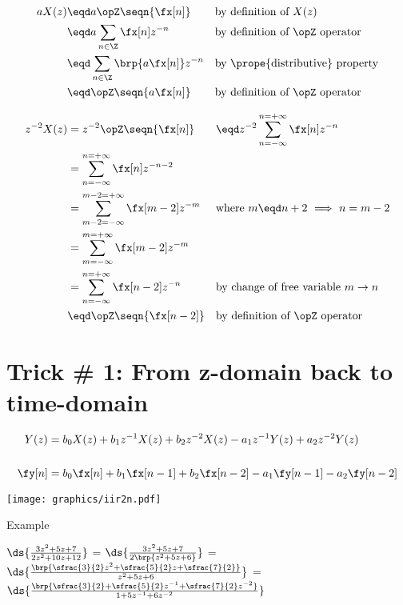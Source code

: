 \begin{align*}
  a X(z)
    &\eqd a \opZ \seqn{\fx[n]}                && \text{by definition of $X(z)$}
  \\&\eqd a \sum_{n\in\Z} \fx[n] z^{-n}       && \text{by definition of $\opZ$ operator}
  \\&\eqd \sum_{n\in\Z} \brp{a \fx[n]} z^{-n} && \text{by \prope{distributive} property}
  \\&\eqd \opZ\seqn{a\fx[n]}                  && \text{by definition of $\opZ$ operator}
\end{align*}

\begin{align*}
  z^{-2}X(z) 
    &= z^{-2} \opZ\seqn{\fx[n]}
   &&\eqd z^{-2}\sum_{n=-\infty}^{n=+\infty} \fx[n] z^{-n}
  \\&=          \sum_{n=-\infty}^{n=+\infty} \fx[n] z^{-n-2}
  \\&=          \sum_{m-2=-\infty}^{m-2=+\infty} \fx[m-2] z^{-m}
    && \text{where $m\eqd n+2$ $\implies$ $n=m-2$}
  \\&=          \sum_{m=-\infty}^{m=+\infty} \fx[m-2] z^{-m}
  \\&=          \sum_{n=-\infty}^{n=+\infty} \fx[n-2] z^{-n}
    && \text{by change of free variable $m\rightarrow n$}
  \\&\eqd \opZ\seqn{\fx[n-2]}
    && \text{by definition of $\opZ$ operator}
\end{align*}

\section*{Trick \# 1: From z-domain back to time-domain}

\begin{align*}
  Y(z) &=  b_0X(z) + b_1z^{-1}X(z)  + b_2z^{-2}X(z) - a_1 z^{-1}Y(z) + a_2z^{-2}Y(z)
  \\\\
  \fy[n] &= b_0\fx[n] + b_1\fx[n-1] + b_2\fx[n-2] - a_1\fy[n-1] - a_2\fy[n-2]
\end{align*}

\texttt{[image: graphics/iir2n.pdf]}



Example

$\ds{\frac{3z^2 + 5z + 7}{2z^2 + 10z + 12}}$
=
$\ds{\frac{3z^2 + 5z + 7}{2\brp{z^2 + 5z + 6}}}$
=
$\ds{\frac{\brp{\sfrac{3}{2}z^2 + \sfrac{5}{2}z + \sfrac{7}{2}}}
               {z^2 + 5z + 6}}$
=
$\ds{\frac{\brp{\sfrac{3}{2} + \sfrac{5}{2}z^{-1} + \sfrac{7}{2}z^{-2}}}
               {1 + 5z^{-1} + 6z^{-2}}}$

